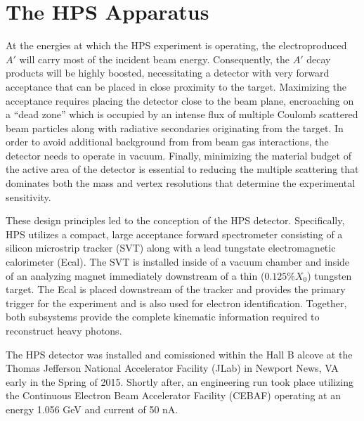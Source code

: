 
\chapter{The HPS Apparatus}


At the energies at which the HPS experiment is operating, the 
electroproduced $A'$ will carry most of the incident beam energy. Consequently,
the $A'$ decay products will be highly boosted, necessitating a detector with very
forward acceptance that can be placed in close proximity to the target.
Maximizing the acceptance requires placing the detector close to the beam plane,
encroaching on a ``dead zone'' which is occupied by an intense flux of multiple
Coulomb scattered beam particles along with radiative secondaries originating
from the target.  In order to avoid additional background from from beam gas
interactions, the detector needs to operate in vacuum. Finally, minimizing the
material budget of the active area of the detector is essential to reducing the
multiple scattering that dominates both the mass and vertex resolutions that
determine the experimental sensitivity.

These design principles led to the conception of the HPS detector.  
Specifically, HPS utilizes a compact, large acceptance forward spectrometer 
consisting of a silicon microstrip tracker (SVT) along with a lead tungstate
electromagnetic calorimeter (Ecal).  The SVT is installed inside of a vacuum
chamber and inside of an analyzing magnet immediately downstream of a thin
($0.125\%X_{0}$) tungsten target.
The Ecal is placed downstream of the tracker and provides the primary 
trigger for the experiment and is also used for electron identification. Together, 
both subsystems provide the complete kinematic information required to 
reconstruct heavy photons.

The HPS detector was installed and comissioned within the Hall B alcove at the
Thomas Jefferson National Accelerator Facility (JLab) in Newport News, VA early
in the Spring of 2015. Shortly after, an engineering run took place utilizing
the Continuous Electron Beam Accelerator Facility (CEBAF) operating at an 
energy 1.056 GeV and current of 50 nA.

